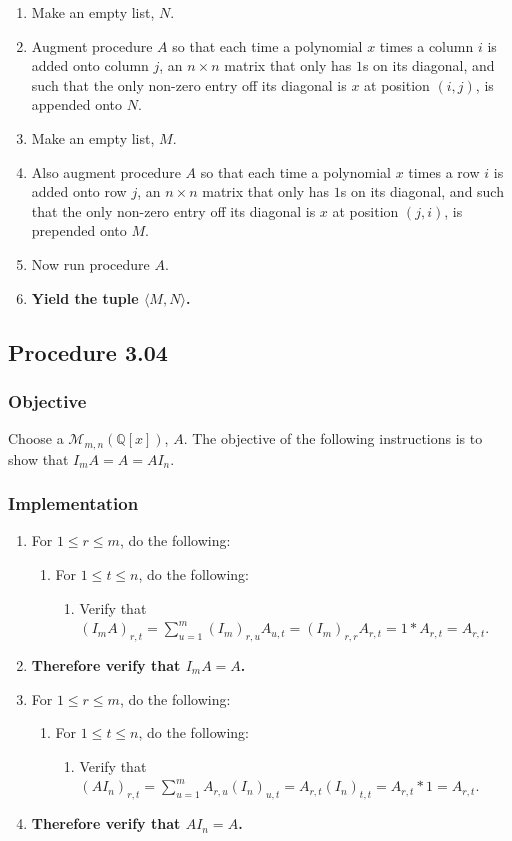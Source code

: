 \documentclass[twocolumn]{article}
\newcommand{\procedure}[2][]{\subsection*{Procedure #2 \ifthenelse{\equal{#1}{}}{}{(#1)}}\label{sec:procedure #2}}
\newcommand{\objective}{\subsubsection*{Objective}}
\newcommand{\implementation}{\subsubsection*{Implementation}}
\begin{document}
				\begin{enumerate}
					\item Make an empty list, $N$.
					\item Augment procedure $A$ so that each time a polynomial $x$ times a column $i$ is added onto column $j$, an $n\times n$ matrix that only has $1$s on its diagonal, and such that the only non-zero entry off its diagonal is $x$ at position $(i,j)$, is appended onto $N$.
					\item Make an empty list, $M$.
					\item Also augment procedure $A$ so that each time a polynomial $x$ times a row $i$ is added onto row $j$, an $n\times n$ matrix that only has $1$s on its diagonal, and such that the only non-zero entry off its diagonal is $x$ at position $(j,i)$, is prepended onto $M$.
					\item Now run procedure $A$.
					\item \textbf{Yield the tuple $\langle M,N\rangle$.}
				\end{enumerate}
		\procedure{3.04}
			\objective
				Choose a $\mathcal{M}_{m,n}(\mathbb{Q}[x])$, $A$. The objective of the following instructions is to show that $I_mA=A=AI_n$.
			\implementation
				\begin{enumerate}
					\item For $1\le r\le m$, do the following:
					\begin{enumerate}
						\item For $1\le t\le n$, do the following:
						\begin{enumerate}
							\item Verify that $(I_mA)_{r,t}=\sum_{u=1}^m (I_m)_{r,u}A_{u,t}=(I_m)_{r,r}A_{r,t}=1*A_{r,t}=A_{r,t}$.
						\end{enumerate}
					\end{enumerate}
					\item \textbf{Therefore verify that $I_mA=A$.}
					\item For $1\le r\le m$, do the following:
					\begin{enumerate}
						\item For $1\le t\le n$, do the following:
						\begin{enumerate}
							\item Verify that $(AI_n)_{r,t}=\sum_{u=1}^m A_{r,u}(I_n)_{u,t}=A_{r,t}(I_n)_{t,t}=A_{r,t}*1=A_{r,t}$.
						\end{enumerate}
					\end{enumerate}
					\item \textbf{Therefore verify that $AI_n=A$.}
				\end{enumerate}
\end{document}
